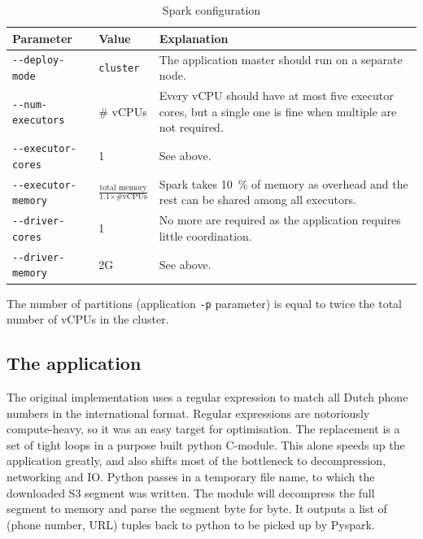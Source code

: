 \documentclass{article}
\begin{document}
\begin{table}[H]
	\caption{Spark configuration}
	\label{tab:spark-config}
	\centering

	\begin{tabular}{llp{6cm}}
	\toprule
	Parameter					& Value	& Explanation \\
	\midrule
	\texttt{-{}-deploy-mode} 		& \texttt{cluster}				& The application master should run on a separate node. \\
	\texttt{-{}-num-executors}	& \# vCPUs		  				& Every vCPU should have at most five executor cores, but a single one is fine when multiple are not required. \\
	\texttt{-{}-executor-cores}	& 1								& See above. \\
	\texttt{-{}-executor-memory}	& $\frac{\text{total memory}}{\text{1.1} \times \text{\# vCPUs}}$	& Spark takes \SI{10}{\percent} of memory as overhead and the rest can be shared among all executors. \\
	\texttt{-{}-driver-cores}		& 1								& No more are required as the application requires little coordination. \\
	\texttt{-{}-driver-memory}	& 2G							& See above. \\
	\bottomrule
	\end{tabular}
\end{table}

The number of partitions (application \texttt{-p} parameter) is equal to twice the total number of vCPUs in the cluster.

\subsection{The application}
The original implementation uses a regular expression to match all Dutch phone numbers in the international format.
Regular expressions are notoriously compute-heavy, so it was an easy target for optimisation.
The replacement is a set of tight loops in a purpose built python C-module.
This alone speeds up the application greatly, and also shifts most of the bottleneck to decompression, networking and IO.
Python passes in a temporary file name, to which the downloaded S3 segment was written.
The module will decompress the full segment to memory and parse the segment byte for byte.
It outputs a list of (phone number, URL) tuples back to python to be picked up by Pyspark.
\end{document}
